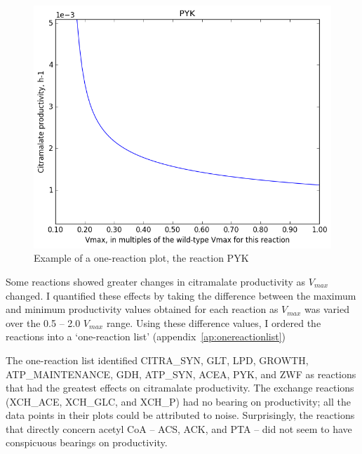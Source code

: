 \documentclass[parskip=full, numbers=noenddot]{scrreprt}
\begin{document}

\begin{figure}[!htbp]
  \centering
  \includegraphics[scale=0.5]{onereacsample}
  \caption{Example of a one-reaction plot, the reaction PYK}
  \label{fig:onereacsample}
\end{figure}

Some reactions showed greater changes in citramalate productivity as $V_{max}$ changed. I quantified these effects by taking the difference between the maximum and minimum productivity values obtained for each reaction as $V_{max}$ was varied over the 0.5 -- 2.0 $V_{max}$ range.  Using these difference values, I ordered the reactions into a `one-reaction list' (appendix~\ref{ap:onereactionlist})

The one-reaction list identified CITRA\_SYN, GLT, LPD, GROWTH, ATP\_MAIN\-TEN\-ANCE, GDH, ATP\_SYN, ACEA, PYK, and ZWF as reactions that had the greatest effects on citramalate productivity.
The exchange reactions (XCH\_ACE, XCH\_GLC, and XCH\_P) had no bearing on productivity; all the data points in their plots could be attributed to noise. Surprisingly, the reactions that directly concern acetyl CoA -- ACS, ACK, and PTA -- did not seem to have conspicuous bearings on productivity.
\end{document}
